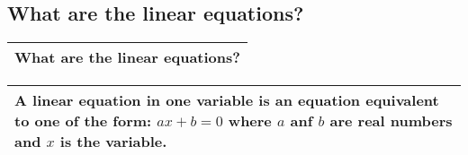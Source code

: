 \subsection{What are the linear equations?}
\begin{small}
    \begin{tabularx}{1\textwidth}{
            p{}
        }
        \toprule
        What are the linear equations?
        \\
        \bottomrule
    \end{tabularx}
\end{small}
\begin{small}
    \begin{tabularx}{1\textwidth}{
            p{}
        }
        \toprule
        \makecell{
            A \textbf{linear equation} in one variable is an equation equivalent
            to one of the form: \\
            $ ax + b = 0 $ \\
            where $a$ anf $b$ are real numbers and $x$ is the variable.
        }
        \\
        \bottomrule

    \end{tabularx}
\end{small}
